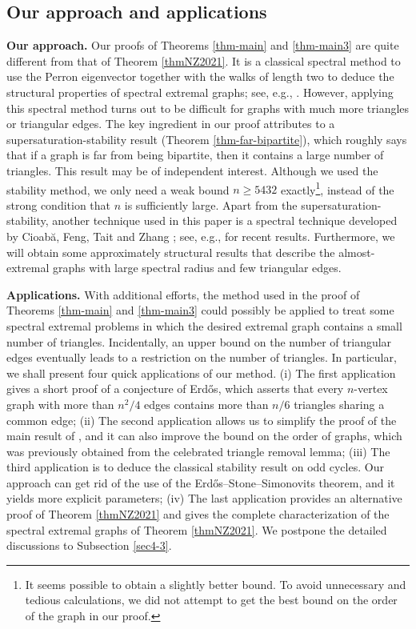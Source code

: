 \documentclass[11pt]{article}
\begin{document}
\subsection{Our approach and applications}


\noindent 
{\bf Our approach.} 
Our proofs of Theorems \ref{thm-main} 
and \ref{thm-main3} are quite different from 
that of Theorem \ref{thmNZ2021}. 
It is a classical spectral method 
to use the Perron eigenvector together with the walks of length two  
to deduce the structural properties of spectral extremal graphs; see, e.g., \cite{TT2017,Tait2019,CDT2023,LN2021outplanar,NZ2021,ZL2022jctb}. 
However, applying this spectral method turns out to be difficult for graphs with much more triangles or triangular edges. 
The key ingredient in our proof attributes to 
a supersaturation-stability result  (Theorem \ref{thm-far-bipartite}), which 
roughly says that if a graph is far from being bipartite, 
then it contains a large number of triangles. 
This result may be of independent interest. 
Although we used the stability method, 
we only need a weak bound $n\ge 5432$ exactly\footnote{It seems possible to obtain a slightly better bound. To avoid unnecessary and tedious calculations, we did not attempt to get the best bound on the order of the graph in our proof. }, 
instead of the strong condition that $n$ is sufficiently large. 
Apart from the supersaturation-stability, 
another technique used in this paper is 
a spectral technique developed by  
Cioab\u{a},  Feng, Tait and  Zhang \cite{CFTZ20}; 
see, e.g., \cite{LP2021,DKLNTW2021,Wang2022} for recent results. Furthermore, we will obtain some approximately 
structural results that describe the almost-extremal graphs with 
large spectral radius and few triangular edges. 



\medskip 
\noindent 
{\bf Applications.}  
With additional efforts, 
 the method used in the proof of Theorems \ref{thm-main} 
 and \ref{thm-main3} could possibly be applied to treat some spectral extremal  problems in which the desired extremal graph contains a small number of triangles. 
Incidentally, an upper bound on the number of triangular edges eventually leads to a restriction on the number of triangles. 
In particular, 
we shall present four quick applications of our method.  
(i) The first application gives a short proof of a conjecture of Erd\H{o}s, which asserts that every $n$-vertex graph with more than $n^2/4$ edges contains more than $n/6$ triangles sharing a common edge;   
(ii) The second application allows us to simplify the proof of the main result 
of \cite{CFTZ20}, and it can also improve the bound on the order of graphs, 
which was previously obtained from the celebrated triangle removal lemma;   
(iii) The third application is to deduce the classical stability result on odd cycles. 
Our approach can get rid of the use of the Erd\H{o}s--Stone--Simonovits theorem, and it yields more explicit parameters;    
(iv) The last application  provides an alternative proof of Theorem \ref{thmNZ2021} and
gives the complete characterization of the spectral extremal graphs of Theorem \ref{thmNZ2021}. 
We postpone the detailed discussions to Subsection \ref{sec4-3}.  
 
\end{document}
